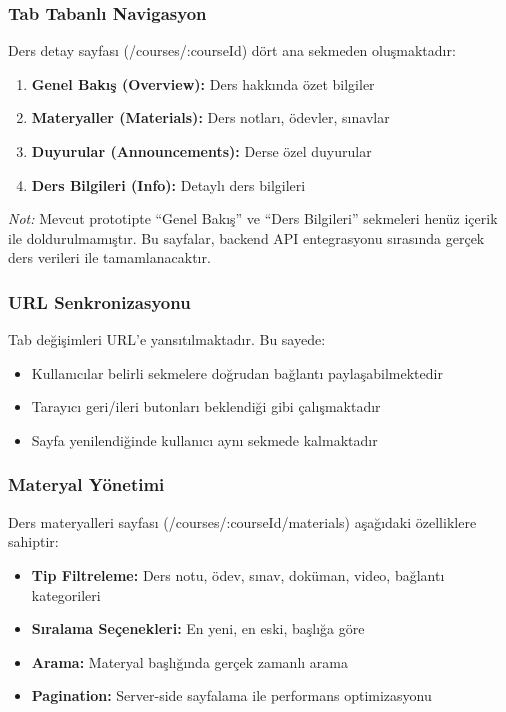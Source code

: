 \documentclass[12pt,a4paper]{article}
\begin{document}
\subsubsection{Tab Tabanlı Navigasyon}

Ders detay sayfası (/courses/:courseId) dört ana sekmeden oluşmaktadır:

\begin{enumerate}
    \item \textbf{Genel Bakış (Overview):} Ders hakkında özet bilgiler
    \item \textbf{Materyaller (Materials):} Ders notları, ödevler, sınavlar
    \item \textbf{Duyurular (Announcements):} Derse özel duyurular
    \item \textbf{Ders Bilgileri (Info):} Detaylı ders bilgileri
\end{enumerate}

\textit{Not:} Mevcut prototipte ``Genel Bakış'' ve ``Ders Bilgileri'' sekmeleri henüz içerik ile doldurulmamıştır. Bu sayfalar, backend API entegrasyonu sırasında gerçek ders verileri ile tamamlanacaktır.

\subsubsection{URL Senkronizasyonu}

Tab değişimleri URL'e yansıtılmaktadır. Bu sayede:
\begin{itemize}
    \item Kullanıcılar belirli sekmelere doğrudan bağlantı paylaşabilmektedir
    \item Tarayıcı geri/ileri butonları beklendiği gibi çalışmaktadır
    \item Sayfa yenilendiğinde kullanıcı aynı sekmede kalmaktadır
\end{itemize}

\subsubsection{Materyal Yönetimi}

Ders materyalleri sayfası (/courses/:courseId/materials) aşağıdaki özelliklere sahiptir:

\begin{itemize}
    \item \textbf{Tip Filtreleme:} Ders notu, ödev, sınav, doküman, video, bağlantı kategorileri
    \item \textbf{Sıralama Seçenekleri:} En yeni, en eski, başlığa göre
    \item \textbf{Arama:} Materyal başlığında gerçek zamanlı arama
    \item \textbf{Pagination:} Server-side sayfalama ile performans optimizasyonu
\end{itemize}
\end{document}

